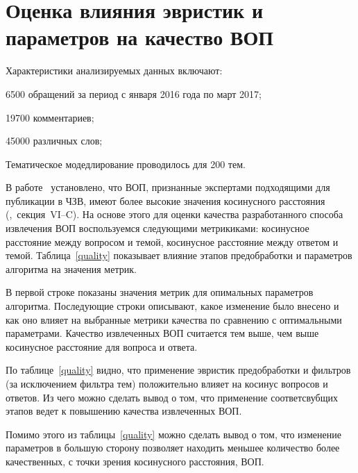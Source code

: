 \section{Оценка влияния эвристик и параметров на качество ВОП}

Характеристики анализируемых данных включают:

\begin{itemize*}
\item 6500 обращений за период с января 2016 года по март 2017;
\item 19700 комментариев;
\item 45000 различных слов;
\item Тематическое модедлирование проводилось для 200 тем.
\end{itemize*}

В работе~\cite{original} установлено, что ВОП, признанные экспертами подходящими для публикации в ЧЗВ, имеют более высокие значения косинусного расстояния (\cite{original},~секция~VI--C). На основе этого для оценки качества разработанного способа извлечения ВОП воспользуемся следующими метрикиками: косинусное расстояние между вопросом и темой, косинусное расстояние между ответом и темой. Таблица~\ref{quality} показывает влияние этапов предобработки и параметров алгоритма на значения метрик. 

В первой строке показаны значения метрик для опимальных параметров алгоритма. Последующие строки описывают, какое изменение было внесено и как оно влияет на выбранные метрики качества по сравнению с оптимальными параметрами. Качество извлеченных ВОП считается тем выше, чем выше косинусное расстояние для вопроса и ответа.

По таблице~\ref{quality} видно, что применение эвристик предобработки и фильтров (за исключением фильтра тем) положительно влияет на косинус вопросов и ответов. Из чего можно сделать вывод о том, что применение соответсвубщих этапов ведет к повышению качества извлеченных ВОП. 

Помимо этого из таблицы~\ref{quality} можно сделать вывод о том, что изменение параметров в большую сторону позволяет находить меньшее количество более качественных, с точки зрения косинусного расстояния, ВОП. 


